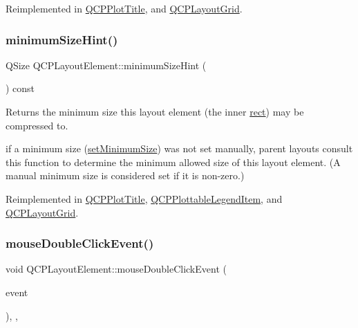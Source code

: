 Reimplemented in \mbox{\hyperlink{class_q_c_p_plot_title_ae24c395b5d3be64b42dcb9e27ed023c4}{Q\+C\+P\+Plot\+Title}}, and \mbox{\hyperlink{class_q_c_p_layout_grid_a3720d1b79931b2bdec3f2158a5f0181c}{Q\+C\+P\+Layout\+Grid}}.

\mbox{\label{class_q_c_p_layout_element_ab3fdb5c9a5189bb2dac10d4d25329cd8}} 
\subsubsection{\texorpdfstring{minimum\+Size\+Hint()}{minimumSizeHint()}}
{\footnotesize\ttfamily Q\+Size Q\+C\+P\+Layout\+Element\+::minimum\+Size\+Hint (\begin{DoxyParamCaption}{ }\end{DoxyParamCaption}) const\hspace{0.3cm}{\ttfamily [virtual]}}

Returns the minimum size this layout element (the inner \mbox{\hyperlink{class_q_c_p_layout_element_a208effccfe2cca4a0eaf9393e60f2dd4}{rect}}) may be compressed to.

if a minimum size (\mbox{\hyperlink{class_q_c_p_layout_element_a5dd29a3c8bc88440c97c06b67be7886b}{set\+Minimum\+Size}}) was not set manually, parent layouts consult this function to determine the minimum allowed size of this layout element. (A manual minimum size is considered set if it is non-\/zero.) 

Reimplemented in \mbox{\hyperlink{class_q_c_p_plot_title_aeed5454134516655723bf2d0499dea24}{Q\+C\+P\+Plot\+Title}}, \mbox{\hyperlink{class_q_c_p_plottable_legend_item_a3adf8154c7e61538656d80464e5695dd}{Q\+C\+P\+Plottable\+Legend\+Item}}, and \mbox{\hyperlink{class_q_c_p_layout_grid_a9ef4b0d626708a1ada2cfea3a5973b80}{Q\+C\+P\+Layout\+Grid}}.

\mbox{\label{class_q_c_p_layout_element_aa8fef6486cb6ceb7c82cbdd50bc32ee9}} 
\subsubsection{\texorpdfstring{mouse\+Double\+Click\+Event()}{mouseDoubleClickEvent()}}
{\footnotesize\ttfamily void Q\+C\+P\+Layout\+Element\+::mouse\+Double\+Click\+Event (\begin{DoxyParamCaption}\item[{Q\+Mouse\+Event $\ast$}]{event }\end{DoxyParamCaption})\hspace{0.3cm}{\ttfamily [inline]}, {\ttfamily [protected]}, {\ttfamily [virtual]}}

